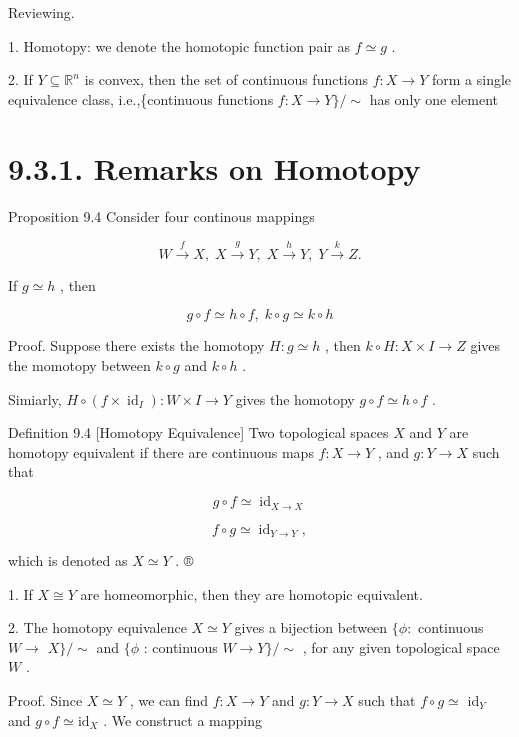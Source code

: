 Reviewing.

1. Homotopy: we denote the homotopic function pair as \(f \simeq  g\) .

2. If \(Y \subseteq  {\mathbb{R}}^{n}\) is convex, then the set of continuous functions \(f : X \rightarrow  Y\) form a single equivalence class, i.e.,\{continuous functions \(f : X \rightarrow  Y\} / \sim\) has only one element

\section*{9.3.1. Remarks on Homotopy}

Proposition 9.4 Consider four continous mappings

\[
W\overset{f}{ \rightarrow  }X,\;X\overset{g}{ \rightarrow  }Y,\;X\overset{h}{ \rightarrow  }Y,\;Y\overset{k}{ \rightarrow  }Z.
\]

If \(g \simeq  h\) , then

\[
g \circ  f \simeq  h \circ  f,\;k \circ  g \simeq  k \circ  h
\]

Proof. Suppose there exists the homotopy \(H : g \simeq  h\) , then \(k \circ  H : X \times  I \rightarrow  Z\) gives the momotopy between \(k \circ  g\) and \(k \circ  h\) .

Simiarly, \(H \circ  \left( {f \times  {\operatorname{id}}_{I}}\right)  : W \times  I \rightarrow  Y\) gives the homotopy \(g \circ  f \simeq  h \circ  f\) .

Definition 9.4 [Homotopy Equivalence] Two topological spaces \(X\) and \(Y\) are homotopy equivalent if there are continuous maps \(f : X \rightarrow  Y\) , and \(g : Y \rightarrow  X\) such that

\[
g \circ  f \simeq  {\operatorname{id}}_{X \rightarrow  X}
\]

\[
f \circ  g \simeq  {\operatorname{id}}_{Y \rightarrow  Y},
\]

which is denoted as \(X \simeq  Y\) . ®

1. If \(X \cong  Y\) are homeomorphic, then they are homotopic equivalent.

2. The homotopy equivalence \(X \simeq  Y\) gives a bijection between \(\{ \phi  :\) continuous \(W \rightarrow\)  \(X\} / \sim\) and \(\{ \phi\) : continuous \(W \rightarrow  Y\} / \sim\) , for any given topological space \(W\) .

Proof. Since \(X \simeq  Y\) , we can find \(f : X \rightarrow  Y\) and \(g : Y \rightarrow  X\) such that \(f \circ  g \simeq\)  \({\mathrm{{id}}}_{Y}\) and \(g \circ  f \simeq  {\mathrm{{id}}}_{X}\) . We construct a mapping

